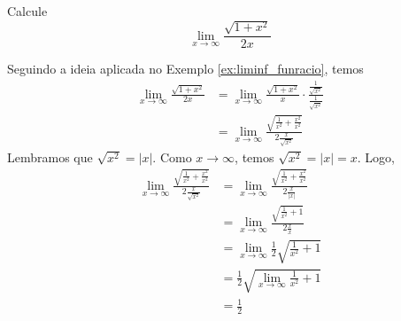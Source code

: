 \cleardoublepage\documentclass[../main.tex]{subfiles}
\begin{document}
\begin{exeresol}
  Calcule
  \begin{equation*}
    \lim_{x\to\infty} \frac{\sqrt{1+x^2}}{2x}
  \end{equation*}
\end{exeresol}
\begin{resol}
  Seguindo a ideia aplicada no Exemplo \ref{ex:liminf_funracio}, temos
  \begin{align*}
    \lim_{x\to\infty} \frac{\sqrt{1+x^2}}{2x} &= \lim_{x\to\infty} \frac{\sqrt{1+x^2}}{x}\cdot \frac{\frac{1}{\sqrt{x^2}}}{\frac{1}{\sqrt{x^2}}} \\
                                             &= \lim_{x\to\infty} \frac{\sqrt{\frac{1}{x^2}+\frac{x^2}{x^2}}}{2\frac{x}{\sqrt{x^2}}}
  \end{align*}
  Lembramos que $\sqrt{x^2}=|x|$. Como $x\to\infty$, temos $\sqrt{x^2} = |x|=x$. Logo,
  \begin{align*}
    \lim_{x\to\infty} \frac{\sqrt{\frac{1}{x^2}+\frac{x^2}{x^2}}}{2\frac{x}{\sqrt{x^2}}} &= \lim_{x\to\infty} \frac{\sqrt{\frac{1}{x^2}+\frac{x^2}{x^2}}}{2\frac{x}{|x|}}\\
                                                                                         &= \lim_{x\to\infty} \frac{\sqrt{\frac{1}{x^2}+1}}{2\frac{x}{x}}\\
                                                                                         &= \lim_{x\to\infty} \frac{1}{2}\sqrt{\frac{1}{x^2}+1}\\
                                                                                         &= \frac{1}{2}\sqrt{\lim_{x\to\infty} \frac{1}{x^2}+1}\\
                                                                                         &= \frac{1}{2}
  \end{align*}
\end{resol}
\end{document}
